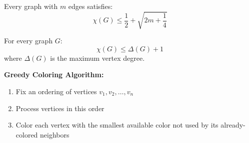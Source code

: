 \documentclass[8pt,a4paper,landscape]{extarticle}
\begin{document}
\begin{cscolumns}
\begin{theorem}
Every graph with $m$ edges satisfies:
\[ \chi(G)\le\frac{1}{2}+\sqrt{2m+\frac{1}{4}} \]
\end{theorem}
\begin{theorem}[Greedy]
For every graph $G$:
\[ \chi(G)\le\Delta(G)+1 \]
where $\Delta(G)$ is the maximum vertex degree.
\end{theorem}
\textbf{Greedy Coloring Algorithm:}
\begin{enumerate}[label=\arabic*.]
\item Fix an ordering of vertices $v_1,v_2,\dots,v_n$
\item Process vertices in this order
\item Color each vertex with the smallest available color not used by its already-colored neighbors
\end{enumerate}

\end{cscolumns}
\newpage
\end{document}
